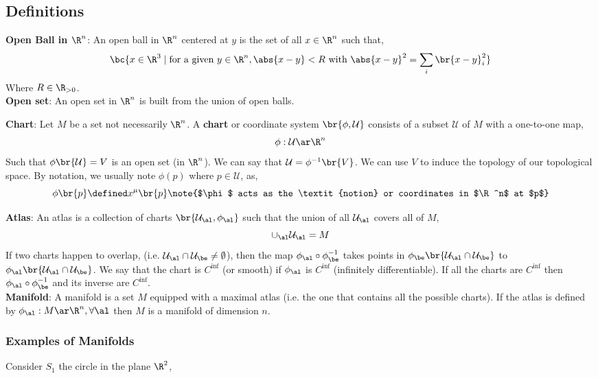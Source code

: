 \documentclass{article}
\begin{document}
\subsection{Definitions}

\textbf{Open Ball in $\R^n$}: An open ball in $\R^n$ centered at $y$ is the set of all $x \in \R^n$ such that,
\[ \bc{x \in \R^3 \mid \text{for a given } y \in \R^n, \abs{x - y} < R \text{ with } \abs{x-y}^2 = \sum_i \br{x-y}_i^2} \]
Where $R \in \R_{>0}$.\\

\textbf{Open set}: An open set in $\R^n$ is built from the union of open balls.

\textbf{Chart}: Let $M$ be a set not necessarily $\R^n$. A \textbf{chart} or coordinate system $\br{\phi, \mathcal{U}}$ consists of a subset $\mathcal{U}$ of $M$ with a one-to-one map,
\[ \phi : \mathcal{U} \ar \R^n \]
Such that $\phi\br{\mathcal{U}} = V$ is an open set (in $\R^n$). We can say that $\mathcal{U} = \phi^{-1}\br{V}$. We can use $V$ to induce the topology of our topological space. By notation, we usually note $\phi(p)$ where $p \in \mathcal{U}$, as,
\[ \phi\br{p} \defined x^{\mu} \br{p} \note{$\phi$ acts as the \textit{notion} or coordinates in $\R^n$ at $p$} \]

\textbf{Atlas}: An atlas is a collection of charts $\br{\mathcal{U}_\al, \phi_\al}$ such that the union of all $\mathcal{U}_\al$ covers all of $M$,
\[ \cup_\al \mathcal{U}_\al = M \]
If two charts happen to overlap, (i.e. $\mathcal{U}_\al \cap \mathcal{U}_\be \neq \emptyset$), then the map $\phi_\al \circ \phi_\be^{-1}$ takes points in $\phi_\be \br{\mathcal{U}_\al\cap\mathcal{U}_\be}$ to $\phi_\al \br{\mathcal{U}_\al\cap\mathcal{U}_\be}$. We say that the chart is $C^\inf$ (or smooth) if $\phi_\al$ is $C^\inf$ (infinitely differentiable). If all the charts are $C^\inf$ then $\phi_\al \circ \phi_\be^{-1}$ and its inverse are $C^\inf$. \\

\textbf{Manifold}: A manifold is a set $M$ equipped with a maximal atlas (i.e. the one that contains all the possible charts). If the atlas is defined by $\phi_\al : M \ar \R^n, \forall \al$ then $M$ is a manifold of dimension $n$.

\subsubsection{Examples of Manifolds}

Consider $S_1$ the circle in the plane $\R^2$,
\end{document}
